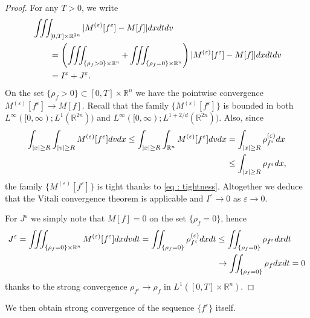 \documentclass{amsart}
\theoremstyle{plain}
\theoremstyle{remark}
\numberwithin{equation}{section}
\newcommand{\R}{\mathbb{R}}
\newcommand{\ve}{\varepsilon}
\newcommand{\dx}{\textnormal{d}x}
\newcommand{\dv}{\textnormal{d}v}
\newcommand{\dt}{\textnormal{d}t}
\newcommand{\intr}{\int_{\R^n}}
\begin{document}
\begin{proof}
    For any $T>0$, we write
    \begin{align*}
        &\iiint_{[0,T]\times\R^{2n}} |M^{(\ve)}[f^\ve] - M[f]|\dx \dt \dv \\
        &\qquad = \left(\iiint_{\{\rho_f>0\}\times \R^n} + \iiint_{\{\rho_f = 0\}\times \R^n}\right) |M^{(\ve)}[f^\ve] - M[f]|\dx \dt \dv\\
        &\qquad = I^\ve + J^\ve.
    \end{align*}
    On the set $\{\rho_f > 0\}\subset [0,T]\times\R^n$ we have the pointwise convergence $M^{(\ve)}[f^\ve] \to M[f]$. Recall that the family $\{M^{(\ve)}[f^\ve]\}$ is bounded in both $L^\infty([0,\infty);L^1(\R^{2n}))$ and $L^\infty([0,\infty);L^{1+2/d}(\R^{2n}))$. Also, since
    \begin{align*}
        \int_{|x|\ge R}\int_{|v|\ge R} M^{(\ve)}[f^\ve] \dv \dx \le \int_{|x|\ge R}\intr M^{(\ve)}[f^\ve] \dv \dx &= \int_{|x|\ge R} \rho_{f^\ve}^{(\ve)} \dx\\
        &\le \int_{|x|\ge R} \rho_{f^\ve}\dx, 
    \end{align*}
    the family $\{M^{(\ve)}[f^\ve]\}$ is tight thanks to \eqref{eq : tightness}. Altogether we deduce that the Vitali convergence theorem is applicable and $I^\ve\to 0$ as $\ve \to 0$.

    For $J^\ve$ we simply note that $M[f] = 0$ on the set $\{\rho_f = 0\}$, hence
    \begin{align*}
        J^\ve = \iiint_{\{\rho_f = 0\}\times \R^n} M^{(\ve)}[f^\ve] \dx \dv \dt = \iint_{\{\rho_f = 0\}} \rho_{f^\ve}^{(\ve)} \dx \dt &\le \iint_{\{\rho_f = 0\}} \rho_{f^\ve} \dx \dt\\
        &\to \iint_{\{\rho_f = 0\}} \rho_f \dx \dt = 0
    \end{align*}
    thanks to the strong convergence $\rho_{f^\ve}\to \rho_f$ in $L^1([0,T]\times\R^n)$.  
\end{proof}

We then obtain strong convergence of the sequence $\{f^\ve\}$ itself.
\end{document}
